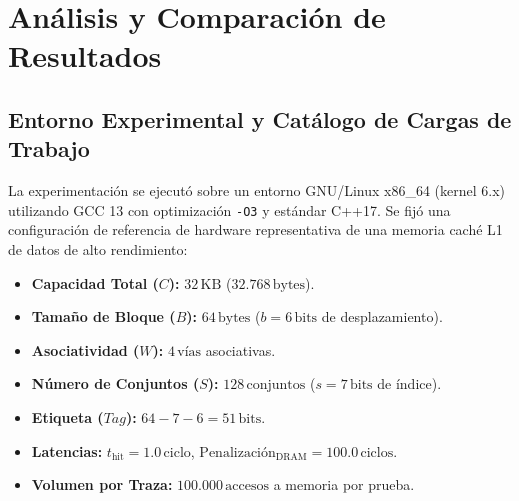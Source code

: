 \documentclass[11pt,letterpaper]{article}
\begin{document}
\newpage
\section{Análisis y Comparación de Resultados}

\subsection{Entorno Experimental y Catálogo de Cargas de Trabajo}
La experimentación se ejecutó sobre un entorno GNU/Linux x86\_64 (kernel 6.x) utilizando GCC 13 con optimización \texttt{-O3} y estándar C++17. Se fijó una configuración de referencia de hardware representativa de una memoria caché L1 de datos de alto rendimiento:
\begin{itemize}
    \item \textbf{Capacidad Total ($C$):} $32\,\text{KB}$ ($32.768\,\text{bytes}$).
    \item \textbf{Tamaño de Bloque ($B$):} $64\,\text{bytes}$ ($b = 6\,\text{bits}$ de desplazamiento).
    \item \textbf{Asociatividad ($W$):} $4\,\text{vías}$ asociativas.
    \item \textbf{Número de Conjuntos ($S$):} $128\,\text{conjuntos}$ ($s = 7\,\text{bits}$ de índice).
    \item \textbf{Etiqueta ($Tag$):} $64 - 7 - 6 = 51\,\text{bits}$.
    \item \textbf{Latencias:} $t_{\text{hit}} = 1.0\,\text{ciclo}$, $\text{Penalización}_{\text{DRAM}} = 100.0\,\text{ciclos}$.
    \item \textbf{Volumen por Traza:} $100.000\,\text{accesos}$ a memoria por prueba.
\end{itemize}
\end{document}

